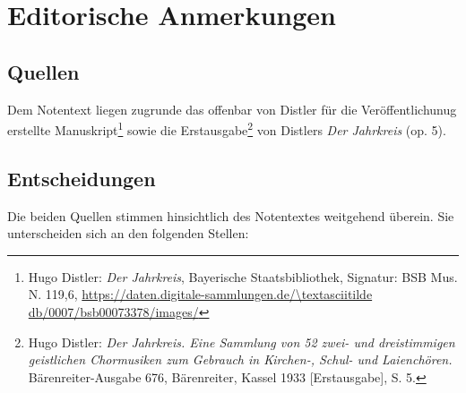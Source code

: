 \documentclass[a4paper]{book}
\begin{document}
\section{Editorische Anmerkungen}
\begin{multicols}{2}

\subsection{Quellen}

Dem Notentext liegen zugrunde das offenbar von Distler für die
Veröffentlichunug erstellte Manuskript\footnote{Hugo Distler: \emph{Der
  Jahrkreis}, Bayerische Staatsbibliothek, Signatur: BSB Mus. N. 119,6,
  \url{https://daten.digitale-sammlungen.de/\textasciitilde db/0007/bsb00073378/images/}}
sowie die Erstausgabe\footnote{Hugo Distler: \emph{Der Jahrkreis. Eine
  Sammlung von 52 zwei- und dreistimmigen geistlichen Chormusiken zum
  Gebrauch in Kirchen-, Schul- und Laienchören.} Bärenreiter-Ausgabe
  676, Bärenreiter, Kassel 1933 {[}Erstausgabe{]}, S. 5.} von Distlers
\emph{Der Jahrkreis} (op. 5).

\subsection{Entscheidungen}

Die beiden Quellen stimmen hinsichtlich des Notentextes weitgehend
überein. Sie unterscheiden sich an den folgenden Stellen:


\end{multicols}
\end{document}
